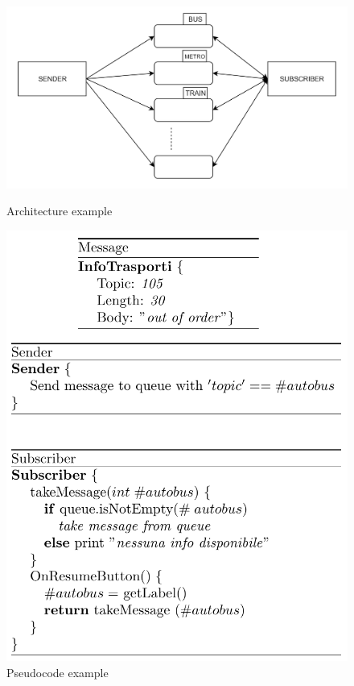 \documentclass{article}
\begin{document}
\begin{figure}[H]
  \centering
  \begin{minipage}[H]{0.55\textwidth}
    \includegraphics[width=\textwidth]{cattura9.png}
    \caption  {Architecture example}
  \end{minipage}
  \hfill
  \begin{minipage}[H]{0.35\textwidth}
    \includegraphics[width=\textwidth]{cattura12.png}
\caption {Pseudocode example}
  \end{minipage}
\end{figure}
\clearpage
\end{document}
